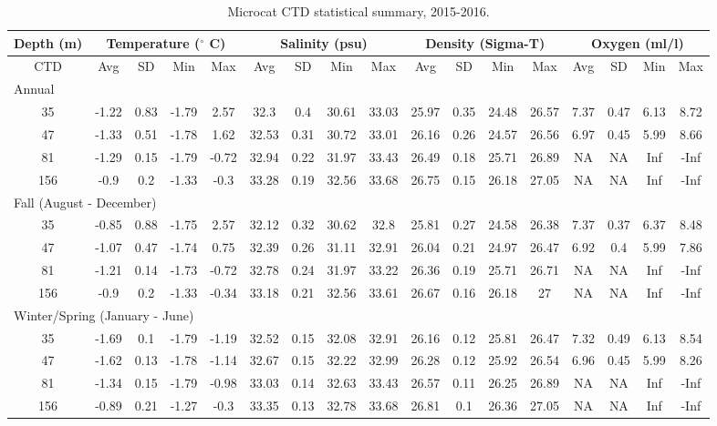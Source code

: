 \documentclass[12pt]{dforeport}
\begin{document}
\begin{landscape}
\begin{table}[ht] 
\centering
\caption[Microcat CTD statistical summary, 2015-2016]{Microcat CTD statistical summary, 2015-2016.} 
\label{t:ss_2015_2016}
\begin{tabular}{c | c c c c | c c c c | c c c c | c c c c}
\toprule 
\multicolumn{1}{c}{\textbf{Depth (m)}} & \multicolumn{4}{c}{\textbf{Temperature ($^\circ$ C)}} & \multicolumn{4}{c}{\textbf{Salinity (psu)}} & \multicolumn{4}{c}{\textbf{Density (Sigma-T)}} & \multicolumn{4}{c}{\textbf{Oxygen (ml/l)}} \\\hline
\midrule
CTD & Avg & SD & Min & Max & Avg & SD & Min & Max & Avg & SD & Min & Max & Avg & SD & Min & Max \\  
\midrule 
\multicolumn{17}{l}{Annual} \\
\midrule
35 & -1.22 & 0.83 & -1.79 & 2.57 & 32.3 & 0.4 & 30.61 & 33.03 & 25.97 & 0.35 & 24.48 & 26.57 & 7.37 & 0.47 & 6.13 & 8.72 \\
47 & -1.33 & 0.51 & -1.78 & 1.62 & 32.53 & 0.31 & 30.72 & 33.01 & 26.16 & 0.26 & 24.57 & 26.56 & 6.97 & 0.45 & 5.99 & 8.66 \\
81 & -1.29 & 0.15 & -1.79 & -0.72 & 32.94 & 0.22 & 31.97 & 33.43 & 26.49 & 0.18 & 25.71 & 26.89 & NA & NA & Inf & -Inf \\
156 & -0.9 & 0.2 & -1.33 & -0.3 & 33.28 & 0.19 & 32.56 & 33.68 & 26.75 & 0.15 & 26.18 & 27.05 & NA & NA & Inf & -Inf \\
\midrule 
\multicolumn{17}{l}{Fall (August - December)} \\
\midrule
35 & -0.85 & 0.88 & -1.75 & 2.57 & 32.12 & 0.32 & 30.62 & 32.8 & 25.81 & 0.27 & 24.58 & 26.38 & 7.37 & 0.37 & 6.37 & 8.48 \\
47 & -1.07 & 0.47 & -1.74 & 0.75 & 32.39 & 0.26 & 31.11 & 32.91 & 26.04 & 0.21 & 24.97 & 26.47 & 6.92 & 0.4 & 5.99 & 7.86 \\
81 & -1.21 & 0.14 & -1.73 & -0.72 & 32.78 & 0.24 & 31.97 & 33.22 & 26.36 & 0.19 & 25.71 & 26.71 & NA & NA & Inf & -Inf \\
156 & -0.9 & 0.2 & -1.33 & -0.34 & 33.18 & 0.21 & 32.56 & 33.61 & 26.67 & 0.16 & 26.18 & 27 & NA & NA & Inf & -Inf \\
\midrule  
\multicolumn{17}{l}{Winter/Spring (January - June)} \\
\midrule
35 & -1.69 & 0.1 & -1.79 & -1.19 & 32.52 & 0.15 & 32.08 & 32.91 & 26.16 & 0.12 & 25.81 & 26.47 & 7.32 & 0.49 & 6.13 & 8.54 \\
47 & -1.62 & 0.13 & -1.78 & -1.14 & 32.67 & 0.15 & 32.22 & 32.99 & 26.28 & 0.12 & 25.92 & 26.54 & 6.96 & 0.45 & 5.99 & 8.26 \\
81 & -1.34 & 0.15 & -1.79 & -0.98 & 33.03 & 0.14 & 32.63 & 33.43 & 26.57 & 0.11 & 26.25 & 26.89 & NA & NA & Inf & -Inf \\
156 & -0.89 & 0.21 & -1.27 & -0.3 & 33.35 & 0.13 & 32.78 & 33.68 & 26.81 & 0.1 & 26.36 & 27.05 & NA & NA & Inf & -Inf \\
\bottomrule
\end{tabular}
\end{table}


\end{landscape}
\end{document}
